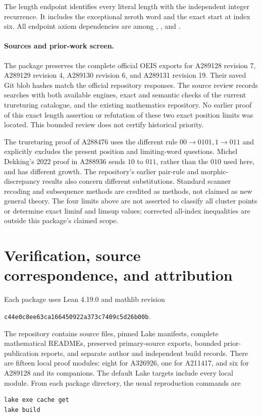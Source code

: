 \documentclass[11pt]{article}
\begin{document}
The length endpoint  identifies
every literal length with the independent integer recurrence.
It includes the exceptional zeroth word and the exact start at
index six. All endpoint axiom dependencies are among
, , and .

\paragraph{Sources and prior-work screen.}
The package preserves the complete official OEIS exports for
A289128 revision 7, A289129 revision 4, A289130 revision 6, and
A289131 revision 19. Their saved Git blob hashes match the
official repository responses. The source review records searches
with both available engines, exact and semantic checks of the
current trureturing catalogue, and the existing mathematics
repository. No earlier proof of this exact length assertion or
refutation of these two exact position limits was located. This
bounded review does not certify historical priority.

The trureturing proof of A288476 uses the different rule
$00\to0101,1\to011$ and explicitly excludes the present position
and limiting-word questions. Michel Dekking's 2022 proof in
A288936 sends $10$ to $011$, rather than the $010$ used here, and
has different growth. The repository's earlier pair-rule and
morphic-discrepancy results also concern different substitutions.
Standard scanner recoding and subsequence methods are credited as
methods, not claimed as new general theory. The four limits above
are not asserted to classify all cluster points or determine exact
liminf and limsup values; corrected all-index inequalities are
outside this package's claimed scope.

\section{Verification, source correspondence, and attribution}
\label{sec:verification}

Each package uses Lean 4.19.0 and mathlib revision
\begin{center}
\texttt{c44e0c8ee63ca166450922a373c7409c5d26b00b}.
\end{center}
The repository contains source files, pinned Lake manifests,
complete mathematical READMEs, preserved primary-source exports,
bounded prior-publication reports, and separate author and
independent build records. There are fifteen local proof modules:
eight for A326926, one for A211417, and six for A289128 and its
companions. The default Lake targets include every local module.
From each package directory, the usual reproduction commands are
\begin{verbatim}
lake exe cache get
lake build
\end{verbatim}
\end{document}
